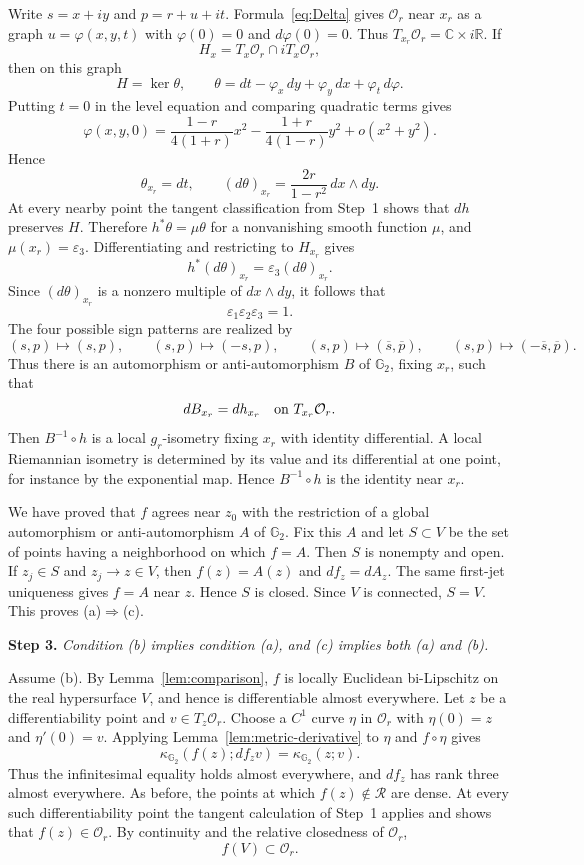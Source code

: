 \documentclass[12pt]{amsart}
\newcommand{\CC}{\mathbb C}
\newcommand{\RR}{\mathbb R}
\newcommand{\GG}{\mathbb G_2}
\newcommand{\cR}{\mathcal R}
\begin{document}
Write $s=x+iy$ and $p=r+u+it$. Formula~\eqref{eq:Delta} gives
$\mathcal O_r$ near $x_r$ as a graph
$u=\varphi(x,y,t)$ with $\varphi(0)=0$ and $d\varphi(0)=0$. Thus
$T_{x_r}\mathcal O_r=\CC\times i\RR$. If
\[
 H_x=T_x\mathcal O_r\cap iT_x\mathcal O_r,
\]
then on this graph
\[
 H=\ker\theta,
 \qquad
 \theta=dt-\varphi_x\,dy+\varphi_y\,dx+\varphi_t\,d\varphi.
\]
Putting $t=0$ in the level equation and comparing quadratic terms gives
\[
 \varphi(x,y,0)=
 \frac{1-r}{4(1+r)}x^2-
 \frac{1+r}{4(1-r)}y^2+o(x^2+y^2).
\]
Hence
\[
 \theta_{x_r}=dt,
 \qquad
 (d\theta)_{x_r}=\frac{2r}{1-r^2}\,dx\wedge dy.
\]
At every nearby point the tangent classification from Step~1 shows that
$dh$ preserves $H$. Therefore $h^*\theta=\mu\theta$ for a nonvanishing smooth
function $\mu$, and $\mu(x_r)=\varepsilon_3$. Differentiating and restricting
to $H_{x_r}$ gives
\[
 h^*(d\theta)_{x_r}=\varepsilon_3(d\theta)_{x_r}.
\]
Since $(d\theta)_{x_r}$ is a nonzero multiple of $dx\wedge dy$, it follows
that
\[
 \varepsilon_1\varepsilon_2\varepsilon_3=1.
\]
The four possible sign patterns are realized by
\[
 (s,p)\mapsto(s,p),\qquad
 (s,p)\mapsto(-s,p),\qquad
 (s,p)\mapsto(\overline s,\overline p),\qquad
 (s,p)\mapsto(-\overline s,\overline p).
\]
Thus there is an automorphism or anti-automorphism $B$ of $\GG$, fixing
$x_r$, such that
\[
 dB_{x_r}=dh_{x_r}
 \quad\hbox{on }T_{x_r}\mathcal O_r.
\]
Then $B^{-1}\circ h$ is a local $g_r$-isometry fixing $x_r$ with identity
differential. A local Riemannian isometry is determined by its value and its
differential at one point, for instance by the exponential map. Hence
$B^{-1}\circ h$ is the identity near $x_r$.

We have proved that $f$ agrees near $z_0$ with the restriction of a
global automorphism or anti-automorphism $A$ of $\GG$. Fix this $A$ and let
$S\subset V$ be the set of points having a neighborhood on which $f=A$.
Then $S$ is nonempty and open. If $z_j\in S$ and
$z_j\to z\in V$, then
$f(z)=A(z)$ and $df_z=dA_z$. The same first-jet
uniqueness gives $f=A$ near $z$. Hence $S$ is closed. Since $V$ is
connected, $S=V$. This proves \textup{(a)}$\Rightarrow$\textup{(c)}.

\medskip

\noindent
\textbf{Step 3.}
\emph{Condition \textup{(b)} implies condition \textup{(a)}, and
\textup{(c)} implies both \textup{(a)} and \textup{(b)}.}

\medskip

Assume \textup{(b)}. By Lemma~\ref{lem:comparison}, $f$ is locally Euclidean
bi-Lipschitz on the real hypersurface $V$, and hence is differentiable almost
everywhere. Let $z$ be a differentiability point and
$v\in T_z\mathcal O_r$. Choose a $C^1$ curve $\eta$ in
$\mathcal O_r$ with $\eta(0)=z$ and $\eta'(0)=v$. Applying
Lemma~\ref{lem:metric-derivative} to $\eta$ and $f\circ\eta$ gives
\[
 \kappa_{\GG}(f(z);df_z v)
 =\kappa_{\GG}(z;v).
\]
Thus the infinitesimal equality holds almost everywhere, and $df_z$
has rank three almost everywhere. As before, the points at which
$f(z)\notin\cR$ are dense. At every such differentiability point the
tangent calculation of Step~1 applies and shows that
$f(z)\in\mathcal O_r$. By continuity and the relative closedness of
$\mathcal O_r$,
\[
 f(V)\subset\mathcal O_r.
\]
\end{document}

